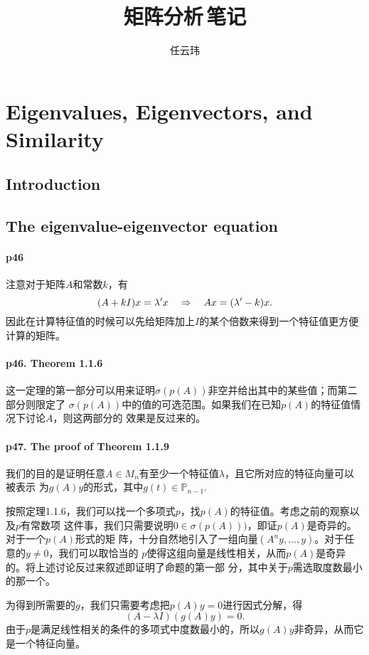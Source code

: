 

\title{矩阵分析$\,$笔记}
\author{任云玮}
\date{}


\maketitle
\tableofcontents

\newpage
\section{Eigenvalues, Eigenvectors, and Similarity}
\subsection{Introduction}
\subsection{The eigenvalue-eigenvector equation}
  \paragraph{p46}
    注意对于矩阵$A$和常数$k$，有
    \[
      (A+kI)x=\lambda^\prime x \quad\Rightarrow\quad
      Ax = (\lambda^\prime-k)x.
    \]
    因此在计算特征值的时候可以先给矩阵加上$I$的某个倍数来得到一个特征值更方便计算的矩阵。

  \paragraph{p46. Theorem 1.1.6}
    这一定理的第一部分可以用来证明$\sigma(p(A))$非空并给出其中的某些值；而第二部分则限定了
    $\sigma(p(A))$中的值的可选范围。如果我们在已知$p(A)$的特征值情况下讨论$A$，则这两部分的
    效果是反过来的。

  \paragraph{p47. The proof of Theorem 1.1.9}
    我们的目的是证明任意$A\in M_n$有至少一个特征值$\lambda$，且它所对应的特征向量可以被表示
    为$g(A)y$的形式，其中$g(t)\in\mathbb{P}_{n-1}$.\par
    按照定理1.1.6，我们可以找一个多项式$p$，找$p(A)$的特征值。考虑之前的观察以及$p$有常数项
    这件事，我们只需要说明$0\in\sigma(p(A)))$，即证$p(A)$是奇异的。对于一个$p(A)$形式的矩
    阵，十分自然地引入了一组向量$(A^ny, \dots, y)$。对于任意的$y\ne 0$，我们可以取恰当的
    $p$使得这组向量是线性相关，从而$p(A)$是奇异的。将上述讨论反过来叙述即证明了命题的第一部
    分，其中关于$p$需选取度数最小的那一个。\par
    为得到所需要的$g$，我们只需要考虑把$p(A)y=0$进行因式分解，得
    \[
      (A-\lambda I)(g(A)y) = 0.
    \]
    由于$p$是满足线性相关的条件的多项式中度数最小的，所以$g(A)y$非奇异，从而它是一个特征向量。

